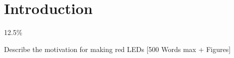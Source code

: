 \newpage
\section{Introduction}
\label{sec:intro}

12.5\%

Describe the motivation for making red LEDs [500 Words max + Figures]

\cite{einstein}

%
% 
%
%
%
%
%
%
%
%
%
%
%
%
% 
